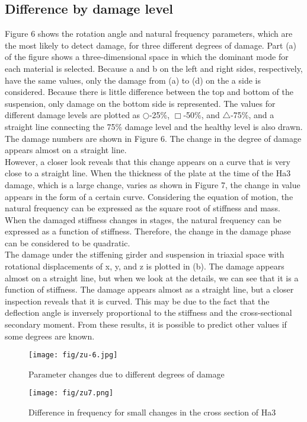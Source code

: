\documentclass{proc-a4}
\begin{document}
\subsection{Difference by damage level}
Figure 6 shows the rotation angle and natural frequency parameters, which are the most likely to detect damage, for three different degrees of damage. Part (a) of the figure shows a three-dimensional space in which the dominant mode for each material is selected. Because a and b on the left and right sides, respectively, have the same values, only the damage from (a) to (d) on the a side is considered. Because there is little difference between the top and bottom of the suspension, only damage on the bottom side is represented. The values for different damage levels are plotted as $\bigcirc$-25\%, $\Box$-50\%, and $\bigtriangleup$-75\%, and a straight line connecting the 75\% damage level and the healthy level is also drawn. The damage numbers are shown in Figure 6. The change in the degree of damage appears almost on a straight line.\\
However, a closer look reveals that this change appears on a curve that is very close to a straight line. When the thickness of the plate at the time of the Ha3 damage, which is a large change, varies as shown in Figure 7, the change in value appears in the form of a certain curve. Considering the equation of motion, the natural frequency can be expressed as the square root of stiffness and mass. When the damaged stiffness changes in stages, the natural frequency can be expressed as a function of stiffness. Therefore, the change in the damage phase can be considered to be quadratic. \\The damage under the stiffening girder and suspension in triaxial space with rotational displacements of x, y, and z is plotted in (b). The damage appears almost on a straight line, but when we look at the details, we can see that it is a function of stiffness. The damage appears almost as a straight line, but a closer inspection reveals that it is curved. This may be due to the fact that the deflection angle is inversely proportional to the stiffness and the cross-sectional secondary moment. From these results, it is possible to predict other values if some degrees are known.
\begin{figure}
\centering %
\begin{minipage}[t]{0.58\textwidth}
    \centering
    \texttt{[image: fig/zu-6.jpg]}
    \caption{Parameter changes due to different degrees of damage}
\end{minipage}
\begin{minipage}[t]{0.38\textwidth}       
    \texttt{[image: fig/zu7.png]}
     \caption{Difference in frequency for small changes in the cross section of Ha3}
\end{minipage}
\end{figure} 
\end{document}
